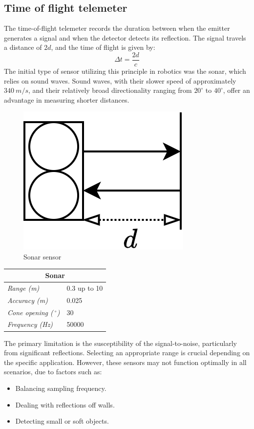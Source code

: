\subsection{Time of flight telemeter}
The time-of-flight telemeter records the duration between when the emitter generates a signal and when the detector detects its reflection.
The signal travels a distance of $2d$, and the time of flight is given by: 
\[\Delta t=\dfrac{2d}{c}\]
The initial type of sensor utilizing this principle in robotics was the sonar, which relies on sound waves.
Sound waves, with their slower speed of approximately $340\:m/s$, and their relatively broad directionality ranging from $20^{\circ}$ to $40^{\circ}$, offer an advantage in measuring shorter distances.
\begin{figure}[H]
    \centering
    \includegraphics[width=0.2\linewidth]{images/sonar.png}
    \caption{Sonar sensor}
\end{figure}
\begin{table}[H]
    \centering
    \begin{tabular}{ll}
    \multicolumn{2}{c}{\textbf{Sonar}}                                   \\ \hline
    \multicolumn{1}{l|}{\textit{Range (m)}}               & 0.3 up to 10 \\
    \multicolumn{1}{l|}{\textit{Accuracy (m)}}            & 0.025        \\
    \multicolumn{1}{l|}{\textit{Cone opening ($\:^\circ$)}} & 30           \\
    \multicolumn{1}{l|}{\textit{Frequency (Hz)}}          & 50000       
    \end{tabular}
\end{table}
The primary limitation is the susceptibility of the signal-to-noise, particularly from significant reflections.
Selecting an appropriate range is crucial depending on the specific application. 
However, these sensors may not function optimally in all scenarios, due to factors such as:
\begin{itemize}
    \item Balancing sampling frequency. 
    \item Dealing with reflections off walls. 
    \item Detecting small or soft objects. 
\end{itemize}
